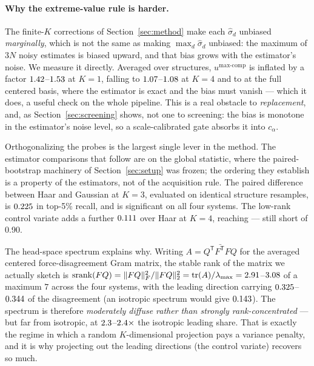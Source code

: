 \documentclass{article}
\begin{document}
\paragraph{Why the extreme-value rule is harder.}
The finite-$K$ corrections of Section~\ref{sec:method} make each $\widehat\sigma_d$ unbiased
\emph{marginally}, which is not the same as making $\max_d\widehat\sigma_d$ unbiased: the maximum of
$3N$ noisy estimates is biased upward, and that bias grows with the estimator's noise. We measure it
directly. Averaged over structures, $u^{\max\text{-comp}}$ is inflated by a factor
$1.42$--$1.53$ at $K{=}1$, falling to
$1.07$--$1.08$ at $K{=}4$ and to \fsMaxBiasExact{} at the full centered
basis, where the estimator is exact and the bias must vanish --- which it does, a useful check on
the whole pipeline. This is a real obstacle to \emph{replacement}, and, as
Section~\ref{sec:screening} shows, not one to screening: the bias is monotone in the estimator's
noise level, so a scale-calibrated gate absorbs it into $c_\alpha$.

Orthogonalizing the probes is the largest single lever in the method. The estimator comparisons that
follow are on the global statistic, where the paired-bootstrap machinery of Section~\ref{sec:setup}
was frozen; the ordering they establish is a property of the estimators, not of the acquisition rule.
The paired difference between Haar and Gaussian at $K{=}3$, evaluated on identical structure
resamples, is
$0.225$ \fsDeltaOrthoCI{} in top-5\% recall, and is significant on all four systems. The
low-rank control variate adds a further $0.111$ \fsDeltaCVCI{} over Haar at $K{=}4$, reaching
\fsCVRecallKFour{} \fsCVRecallKFourCI{} --- still short of 0.90.

The head-space spectrum explains why. Writing $A=\bar{Q^{\mathsf T}F^{\mathsf T}FQ}$ for the averaged
centered force-disagreement Gram matrix, the stable rank of the matrix we actually sketch is
$\operatorname{srank}(FQ)=\|FQ\|_F^2/\|FQ\|_2^2=\operatorname{tr}(A)/\lambda_{\max}
=2.91$--$3.08$ of a maximum $7$ across the four systems, with the leading direction
carrying $0.325$--$0.344$ of the disagreement (an isotropic spectrum would give
$0.143$). The spectrum is therefore \emph{moderately diffuse rather than strongly
rank-concentrated} --- but far from isotropic, at
$2.3$--$2.4\times$ the isotropic leading share.
That is exactly the regime in which a random $K$-dimensional projection pays a variance penalty, and
it is why projecting out the leading directions (the control variate) recovers so much.
\end{document}
